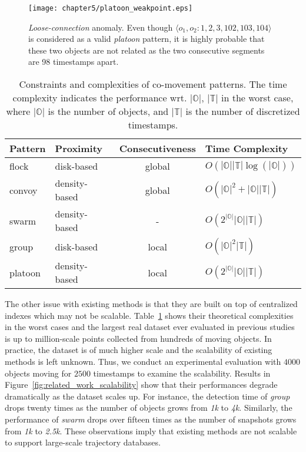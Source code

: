 \begin{figure}[h]
\center
\texttt{[image: chapter5/platoon\_weakpoint.eps]}
\caption{\emph{Loose-connection} anomaly. Even though $\langle o_1, o_2: 1,2,3,102,103,104 \rangle$ is considered as a valid \emph{platoon} pattern, it is highly probable that these two objects are not related as the two consecutive segments  are 98 timestamps apart. 
}
\label{fig:platoon_weakpoint}
\end{figure}

\begin{table}
\centering
\begin{tabular}{|l|l|c|l|}
\hline 
\textbf{Pattern} & {\tiny \textbf{Proximity}} & {\tiny \textbf{Consecutiveness}} & {\tiny \textbf{Time Complexity}}\\ 
\hline 
flock~\cite{gudmundsson2004flock} & disk-based &  global & {\tiny $O(|\mathbb{O}||\mathbb{T}|\log(|\mathbb{O}|))$} \\ 
\hline 
convoy~\cite{jeung2008convoy} & density-based &   global & {\tiny $O(|\mathbb{O}|^2+|\mathbb{O}||\mathbb{T}|)$}\\ 
\hline 
swarm~\cite{li2010swarm} & density-based  & - & {\tiny $O(2^{|\mathbb{O}|}|\mathbb{O}||\mathbb{T}|)$}  \\ 
\hline 
group~\cite{wang2006grouppattern} & disk-based &  local & {\tiny $O(|\mathbb{O}|^2|\mathbb{T}|)$}\\ 
\hline 
platoon~\cite{li2015platoon} & density-based &  local & {\tiny $O(2^{|\mathbb{O}|}|\mathbb{O}||\mathbb{T}|)$}\\ 
\hline 
\end{tabular} 
\caption{Constraints and complexities of co-movement patterns. The time complexity indicates the performance wrt.
$|\mathbb{O}|$, $|\mathbb{T}|$ in the worst case, where $|\mathbb{O}|$ is the number of objects, and $|\mathbb{T}|$ is the number of discretized timestamps.}
\label{tbl:existing_co_patterns}
\end{table}
The other issue with existing methods is that they are built on top of centralized indexes which may not be scalable. Table~\ref{tbl:existing_co_patterns} shows their theoretical complexities in the worst cases and the largest real dataset ever evaluated in previous studies is up to million-scale points collected from hundreds of moving objects. In practice, the dataset is of much higher scale and the scalability of existing methods is left unknown. Thus, we conduct an experimental evaluation with $4000$ objects moving for $2500$ timestamps to examine the scalability. Results in Figure~\ref{fig:related_work_scalability} show that their performances degrade dramatically as the dataset scales up. For instance, the detection time of \emph{group} drops twenty times as the number of objects grows from \emph{1k} to \emph{4k}. Similarly,
the performance of \emph{swarm} drops over fifteen times as the number of snapshots grows from \emph{1k} to \emph{2.5k}.
These observations imply that existing methods are not scalable to support large-scale trajectory databases. 

